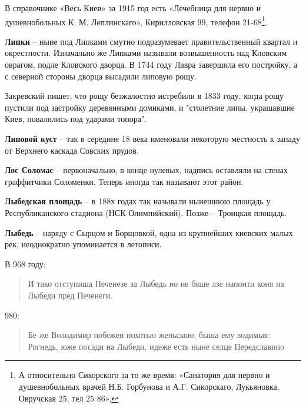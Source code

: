 В справочнике «Весь Киев» за 1915 год есть «Лечебница для нервно и душевнобольных К. М. Леплинскаго», Кирилловская 99, телефон 21-68\footnote{А относительно Сикорского за то же время: «Санатория для нервно и душевнобольных врачей Н.Б. Горбунова и А.Г. Сикорскаго, Лукьяновка, Овручская 25, тел 25 86».}. 
\\

\medskip

\textbf{Липки} – ныне под Липками смутно подразумевает правительственный квартал и окрестности. Изначально же Липками называли возвышенность над Кловским оврагом, подле Кловского дворца. В 1744 году Лавра завершила его постройку, а с северной стороны дворца высадили липовую рощу.

Закревский пишет, что рощу безжалостно истребили в 1833 году, когда рощу пустили под застройку деревянными домиками, и "столетние липы, украшавшие Киев, повалились под ударами топора".\\

\medskip


\textbf{Липовой куст} – так в середине 18 века именовали некоторую местность к западу от Верхнего каскада Совских прудов.\\

\medskip

\textbf{Лос Соломас} – первоначально, в конце нулевых, надпись оставляли на стенах граффитчики Соломенки. Теперь иногда так называют этот район.\\

\medskip

\textbf{Лыбедская площадь} – в 188х годах так называли нынешнюю площадь у Республиканского стадиона (НСК Олимпийский). Позже – Троицкая площадь.\\

\medskip


\textbf{Лыбедь} – наряду с Сырцом и Борщовкой, одна из крупнейших киевских малых рек, неоднократно упоминается в летописи.

В 968 году:

\begin{quotation}
\noindent И тако отступиша Печенезе за Лыбедь но не бяше лзе напоити коня на Лыбеди пред Печенеги.
\end{quotation}

980:

\begin{quotation}
\noindent Бе же Володимир побежен похотью женьскою, быша ему водимыя: Рогнедь, юже посади на Лыбеди, идеже есть ныне селце Передславино
\end{quotation}

